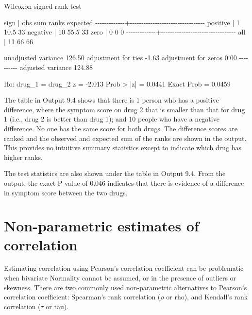 \documentclass[
]{memoir}
\newenvironment{Shaded}{\begin{snugshade}}{\end{snugshade}}
\newcommand{\NormalTok}[1]{#1}
\begin{document}
\begin{Shaded}
\begin{Highlighting}[]
\NormalTok{Wilcoxon signed{-}rank test}

\NormalTok{        sign |      obs   sum ranks    expected}
\NormalTok{{-}{-}{-}{-}{-}{-}{-}{-}{-}{-}{-}{-}{-}+{-}{-}{-}{-}{-}{-}{-}{-}{-}{-}{-}{-}{-}{-}{-}{-}{-}{-}{-}{-}{-}{-}{-}{-}{-}{-}{-}{-}{-}{-}{-}{-}{-}}
\NormalTok{    positive |        1        10.5          33}
\NormalTok{    negative |       10        55.5          33}
\NormalTok{        zero |        0           0           0}
\NormalTok{{-}{-}{-}{-}{-}{-}{-}{-}{-}{-}{-}{-}{-}+{-}{-}{-}{-}{-}{-}{-}{-}{-}{-}{-}{-}{-}{-}{-}{-}{-}{-}{-}{-}{-}{-}{-}{-}{-}{-}{-}{-}{-}{-}{-}{-}{-}}
\NormalTok{         all |       11          66          66}

\NormalTok{unadjusted variance      126.50}
\NormalTok{adjustment for ties       {-}1.63}
\NormalTok{adjustment for zeros       0.00}
\NormalTok{                     {-}{-}{-}{-}{-}{-}{-}{-}{-}{-}}
\NormalTok{adjusted variance        124.88}

\NormalTok{Ho: drug\_1 = drug\_2}
\NormalTok{             z =  {-}2.013}
\NormalTok{    Prob \textgreater{} |z| =   0.0441}
\NormalTok{    Exact Prob =   0.0459}
\end{Highlighting}
\end{Shaded}

The table in Output 9.4 shows that there is 1 person who has a positive difference, where the symptom score on drug 2 that is smaller than that for drug 1 (i.e., drug 2 is better than drug 1); and 10 people who have a negative difference. No one has the same score for both drugs. The difference scores are ranked and the observed and expected sum of the ranks are shown in the output. This provides no intuitive summary statistics except to indicate which drug has higher ranks.

The test statistics are also shown under the table in Output 9.4. From the output, the exact P value of 0.046 indicates that there is evidence of a difference in symptom score between the two drugs.

\hypertarget{non-parametric-estimates-of-correlation}{%
\section{Non-parametric estimates of correlation}\label{non-parametric-estimates-of-correlation}}

Estimating correlation using Pearson's correlation coefficient can be problematic when bivariate Normality cannot be assumed, or in the presence of outliers or skewness. There are two commonly used non-parametric alternatives to Pearson's correlation coefficient: Spearman's rank correlation (\(\rho\) or rho), and Kendall's rank correlation (\(\tau\) or tau).
\end{document}

